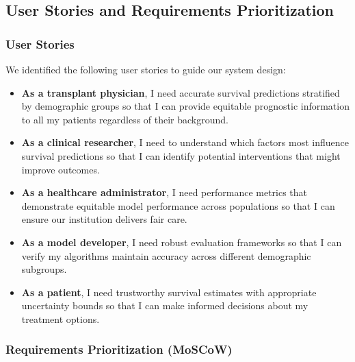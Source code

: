 \subsection{User Stories and Requirements Prioritization}

\subsubsection{User Stories}

We identified the following user stories to guide our system design:

\begin{itemize}
    \item \textbf{As a transplant physician}, I need accurate survival predictions stratified by demographic groups so that I can provide equitable prognostic information to all my patients regardless of their background.
    
    \item \textbf{As a clinical researcher}, I need to understand which factors most influence survival predictions so that I can identify potential interventions that might improve outcomes.
    
    \item \textbf{As a healthcare administrator}, I need performance metrics that demonstrate equitable model performance across populations so that I can ensure our institution delivers fair care.
    
    \item \textbf{As a model developer}, I need robust evaluation frameworks so that I can verify my algorithms maintain accuracy across different demographic subgroups.
    
    \item \textbf{As a patient}, I need trustworthy survival estimates with appropriate uncertainty bounds so that I can make informed decisions about my treatment options.
\end{itemize}

\subsubsection{Requirements Prioritization (MoSCoW)}

